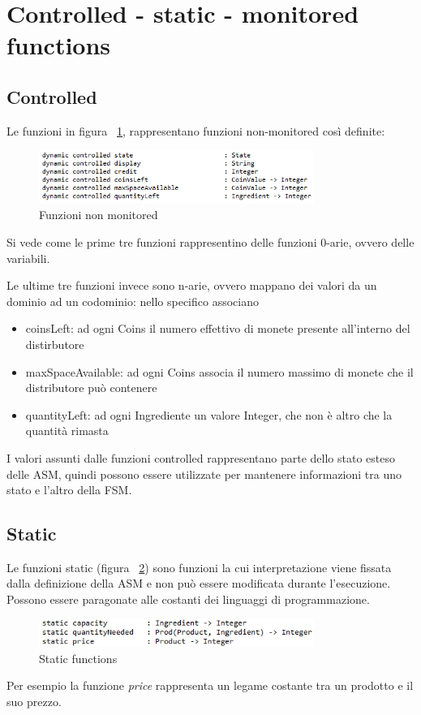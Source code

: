 \section{Controlled - static - monitored functions}
\subsection{Controlled}
Le funzioni in figura ~\ref{fig:notMonitored}, rappresentano funzioni non-monitored così definite:
\begin{figure}[h]
	\centering
	\includegraphics[width=0.8\textwidth]{Immagini/DynamicController.png}
	\caption{Funzioni non monitored}
	\label{fig:notMonitored}
\end{figure}

Si vede come le prime tre funzioni rappresentino delle funzioni 0-arie, ovvero delle variabili.

Le ultime tre funzioni invece sono n-arie, ovvero mappano dei valori da un dominio ad un codominio: nello specifico associano
\begin{itemize}
	\item coinsLeft: ad ogni Coins il numero effettivo di monete presente all'interno del distirbutore
	\item maxSpaceAvailable: ad ogni Coins associa il numero massimo di monete che il distributore può contenere
	\item quantityLeft: ad ogni Ingrediente un valore Integer, che non è altro che la quantità rimasta
\end{itemize}

I valori assunti dalle funzioni controlled rappresentano parte dello stato esteso delle ASM, quindi possono essere utilizzate per mantenere informazioni tra uno stato e l’altro della FSM.

\subsection{Static}
Le funzioni static (figura ~\ref{fig:staticFunc}) sono funzioni la cui interpretazione viene fissata dalla definizione della ASM e non può essere modificata durante l’esecuzione.
Possono essere paragonate alle costanti dei linguaggi di programmazione.
\begin{figure}[h]
	\centering
	\includegraphics[width=0.8\textwidth]{Immagini/StaticFunction.png}
	\caption{Static functions}
	\label{fig:staticFunc}
\end{figure}
Per esempio la funzione \textit{price} rappresenta un legame costante tra un prodotto e il suo prezzo. 

